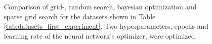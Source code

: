\begin{figure}[htbp!]
	\caption{ Comparison of grid-, random search, bayesian optimization and sparse grid search for the datasets shown in Table \ref{tab:datasets_first_experiment}. Two hyperparameters, epochs and learning rate of the neural network's optimizer, were optimized. }	
	\label{fig:result_first_comparison}
\end{figure}


